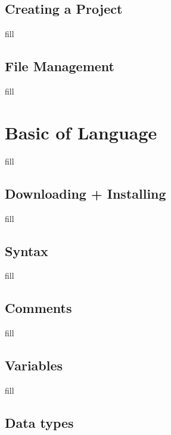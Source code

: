 \documentclass[
  b5paper]{book}
\begin{document}
\hypertarget{creating-a-project}{%
\subsection*{Creating a Project}\label{creating-a-project}}

fill

\hypertarget{file-management}{%
\subsection*{File Management}\label{file-management}}

fill

\hypertarget{basic-of-language}{%
\section{Basic of Language}\label{basic-of-language}}

fill

\hypertarget{downloading-installing-1}{%
\subsection*{Downloading + Installing}\label{downloading-installing-1}}

fill

\hypertarget{syntax}{%
\subsection*{Syntax}\label{syntax}}

fill

\hypertarget{comments}{%
\subsection*{Comments}\label{comments}}

fill

\hypertarget{variables}{%
\subsection*{Variables}\label{variables}}

fill

\hypertarget{data-types}{%
\subsection*{Data types}\label{data-types}}
\end{document}
